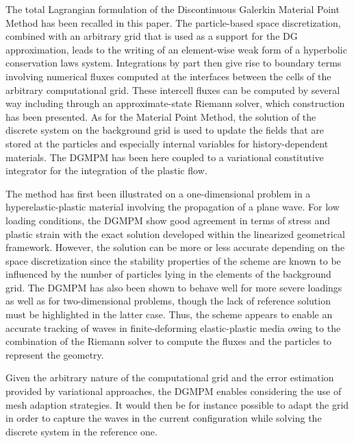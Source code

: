 The total Lagrangian formulation of the Discontinuous Galerkin Material Point Method has been recalled in this paper.
The particle-based space discretization, combined with an arbitrary grid that is used as a support for the DG approximation, leads to the writing of an element-wise weak form of a hyperbolic conservation laws system.
Integrations by part then give rise to boundary terms involving numerical fluxes computed at the interfaces between the cells of the arbitrary computational grid.
These intercell fluxes can be computed by several way including through an approximate-state Riemann solver, which construction has been presented.
As for the Material Point Method, the solution of the discrete system on the background grid is used to update the fields that are stored at the particles and especially internal variables for history-dependent materials.
The DGMPM has been here coupled to a variational constitutive integrator for the integration of the plastic flow.

The method has first been illustrated on a one-dimensional problem in a hyperelastic-plastic material involving the propagation of a plane wave.
For low loading conditions, the DGMPM show good agreement in terms of stress and plastic strain with the exact solution developed within the linearized geometrical framework.
However, the solution can be more or less accurate depending on the space discretization since the stability properties of the scheme are known to be influenced by the number of particles lying in the elements of the background grid.
The DGMPM has also been shown to behave well for more severe loadings as well as for two-dimensional problems, though the lack of reference solution must be highlighted in the latter case.
Thus, the scheme appears to enable an accurate tracking of waves in finite-deforming elastic-plastic media owing to the combination of the Riemann solver to compute the fluxes and the particles to represent the geometry.

Given the arbitrary nature of the computational grid and the error estimation provided by variational approaches, the DGMPM enables considering the use of mesh adaption strategies. 
It would then be for instance possible to adapt the grid in order to capture the waves in the current configuration while solving the discrete system in the reference one.

